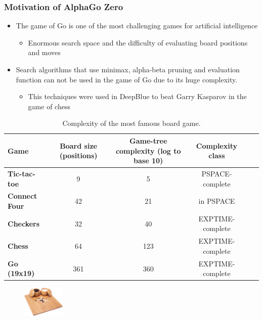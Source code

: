 \documentclass[9pt]{beamer}
\begin{document}
\begin{frame}
	\frametitle{Motivation of AlphaGo Zero}
	\begin{itemize}
		\item The game of Go is one of the most challenging games for artificial intelligence
		\begin{itemize}
			\item Enormous search space and the difficulty of evaluating board positions and moves
		\end{itemize}
		\item Search algorithms that use minimax, alpha-beta pruning and evaluation function can not be used in the game of Go due to its huge complexity.
		\begin{itemize}
			\item This techniques were used in DeepBlue\cite{CAMPBELL200257} to beat Garry Kasparov in the game of chess
		\end{itemize}
		
	\end{itemize}
	
	\begin{table}

		\tiny
		\centering

		\caption{Complexity of the most famous board game.}
		
		\begin{tabular}{lccccc}

		\hline
		\textbf{Game}  &
		Board size (positions)  &
		Game-tree complexity (log to base 10)  &
		Complexity class\\
		\hline
		\hline
		\textbf{Tic-tac-toe}	& 9  & 5 & PSPACE-complete\cite{Reisch1981HexIP} \\
		\textbf{Connect Four} & 42 & 21 & in PSPACE \cite{Allis1994SearchingFS} \\
		\textbf{Checkers} & 32  & 40   & EXPTIME-complete \cite{Robson1984NBN} \\
		\textbf{Chess} & 64 & 123  & EXPTIME-complete \cite{FRAENKEL1981199} \\
		\textbf{Go (19x19)} & 361 & 360 & EXPTIME-complete \cite{inproceedings} \\
		\hline
		\end{tabular}
		\label{tab:game-complexity}
		
	\end{table}

	
	\begin{figure}[h]
		\centering
		\includegraphics[width=2cm]{go-board.jpg}
	\end{figure}

\end{frame}
\end{document}
